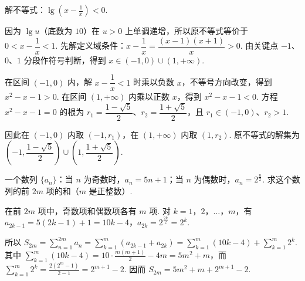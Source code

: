 \documentclass[UTF8,a4paper,oneside,11pt]{ctexbook}
\begin{document}
\begin{problem}
解不等式：\(\lg\left(x-\frac{1}{x}\right) < 0\).
\end{problem}

\begin{solution}
因为 \(\lg u\)（底数为 \(10\)）在 \(u>0\) 上单调递增，所以原不等式等价于 \(0<x-\dfrac1x<1\). 先解定义域条件：\(x-\dfrac1x=\dfrac{(x-1)(x+1)}x>0\). 由关键点 \(-1\)、\(0\)、\(1\) 分段作符号判断，得到 \(x\in(-1,0)\cup(1,+\infty)\).

在区间 \((-1,0)\) 内，解 \(x-\dfrac1x<1\) 时乘以负数 \(x\)，不等号方向改变，得到 \(x^2-x-1>0\). 在区间 \((1,+\infty)\) 内乘以正数 \(x\)，得到 \(x^2-x-1<0\). 方程 \(x^2-x-1=0\) 的根为 \(r_1=\dfrac{1-\sqrt5}{2}\)、\(r_2=\dfrac{1+\sqrt5}{2}\)，且 \(r_1\in(-1,0)\)、\(r_2>1\).

因此在 \((-1,0)\) 内取 \((-1,r_1)\)，在 \((1,+\infty)\) 内取 \((1,r_2)\). 原不等式的解集为 \(\left(-1,\dfrac{1-\sqrt5}{2}\right)\cup\left(1,\dfrac{1+\sqrt5}{2}\right)\).
\end{solution}

\begin{problem}
一个数列 \(\{a_n\}\)：当 \(n\) 为奇数时，\(a_n = 5n + 1\)；当 \(n\) 为偶数时，\(a_n = 2^{\frac n2}\). 求这个数列的前 \(2m\) 项的和（\(m\) 是正整数）.
\end{problem}

\begin{solution}
在前 \(2m\) 项中，奇数项和偶数项各有 \(m\) 项. 对 \(k=1\)，\(2\)，\(\ldots\)，\(m\)，有 \(a_{2k-1}=5(2k-1)+1=10k-4\)，\(a_{2k}=2^{\frac{2k}{2}}=2^k\).

所以 \(\displaystyle S_{2m}=\sum_{n=1}^{2m}a_n=\sum_{k=1}^m\left(a_{2k-1}+a_{2k}\right)=\sum_{k=1}^m(10k-4)+\sum_{k=1}^m2^k\). 其中 \(\displaystyle\sum_{k=1}^m(10k-4)=10\cdot\frac{m(m+1)}2-4m=5m^2+m\)，而 \(\displaystyle\sum_{k=1}^m2^k=\frac{2(2^m-1)}{2-1}=2^{m+1}-2\). 因而 \(\displaystyle S_{2m}=5m^2+m+2^{m+1}-2\).
\end{solution}

\end{document}

